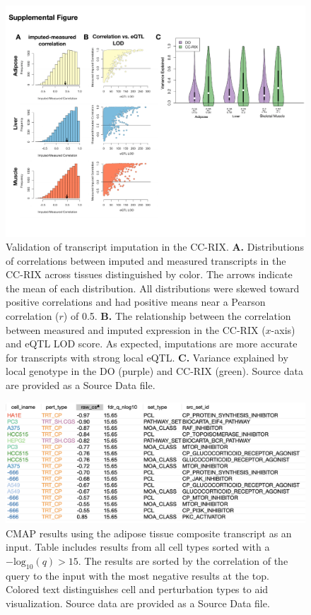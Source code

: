 \documentclass[
]{article}
\begin{document}
\begin{figure}[ht!]
\includegraphics[width=\textwidth]{Figures/Supp_Fig_CC-RIX_Imputation.pdf} 
\caption{Validation of transcript imputation in the CC-RIX. 
\textbf{A.} Distributions of correlations between imputed and 
measured transcripts in the CC-RIX across tissues distinguished
by color. The arrows indicate the mean of each distribution. All 
distributions were skewed toward positive correlations and had 
positive means near a Pearson correlation ($r$) of 0.5. 
\textbf{B.} The relationship between the correlation between 
measured and imputed expression in the CC-RIX ($x$-axis) 
and eQTL LOD score. As expected, imputations are more
accurate for transcripts with strong local eQTL. \textbf{C.} 
Variance explained by local genotype in the DO (purple) and 
CC-RIX (green). Source data are provided as a Source Data file.
}
\label{fig:cc_imputation}
\end{figure}

\begin{figure}[ht!]
\includegraphics[width=\textwidth]{Figures/Supp_Fig_Adipose_all_cell_types.png} 
\caption{CMAP results using the adipose tissue composite transcript as 
an input. Table includes results from all cell types sorted with a 
$-\mathrm{log}_{10}(q) > 15$. The results are sorted by the correlation 
of the query to the input with the most negative results at the top. 
Colored text distinguishes cell and perturbation types to aid
visualization. Source data are provided as a Source Data file.
}
\label{fig:clue_adipose_all}
\end{figure}
\end{document}
